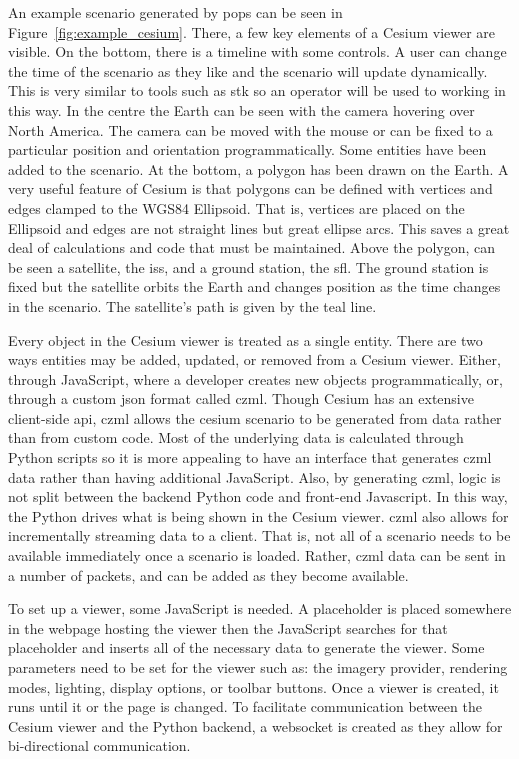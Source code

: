 An example scenario generated by \gls{pops} can be seen in
Figure~\ref{fig:example_cesium}. There, a few key elements of a Cesium viewer
are visible. On the bottom, there is a timeline with some controls. A user can
change the time of the scenario as they like and the scenario will update
dynamically. This is very similar to tools such as \gls{stk} so an operator
will be used to working in this way. In the centre the Earth can be seen with
the camera hovering over North America.  The camera can be moved with the mouse
or can be fixed to a particular position and orientation programmatically.
Some entities have been added to the scenario. At the bottom, a polygon has
been drawn on the Earth. A very useful feature of Cesium is that polygons can
be defined with vertices and edges clamped to the WGS84 Ellipsoid. That is,
vertices are placed on the Ellipsoid and edges are not straight lines but great
ellipse arcs. This saves a great deal of calculations and code that must be
maintained. Above the polygon, can be seen a satellite, the \gls{iss}, and a
ground station, the \gls{sfl}. The ground station is fixed but the satellite
orbits the Earth and changes position as the time changes in the scenario. The
satellite's path is given by the teal line. 

Every object in the Cesium viewer is treated as a single entity. There are two
ways entities may be added, updated, or removed from a Cesium viewer. Either,
through JavaScript, where a developer creates new objects programmatically, or,
through a custom \gls{json} format called \gls{czml}. Though Cesium has an
extensive client-side \gls{api}, \gls{czml} allows the cesium scenario to be
generated from data rather than from custom code. Most of the underlying data
is calculated through Python scripts so it is more appealing to have an
interface that generates \gls{czml} data rather than having additional
JavaScript. Also, by generating \gls{czml}, logic is not split between the
backend Python code and front-end Javascript. In this way, the Python drives
what is being shown in the Cesium viewer. \gls{czml} also allows for
incrementally streaming data to a client. That is, not all of a scenario needs
to be available immediately once a scenario is loaded. Rather, \gls{czml} data
can be sent in a number of packets, and can be added as they become available.

To set up a viewer, some JavaScript is needed. A placeholder is placed
somewhere in the webpage hosting the viewer then the JavaScript searches for
that placeholder and inserts all of the necessary data to generate the viewer.
Some parameters need to be set for the viewer such as: the imagery provider,
rendering modes, lighting, display options, or toolbar buttons. Once a viewer
is created, it runs until it or the page is changed.  To facilitate
communication between the Cesium viewer and the Python backend, a websocket is
created as they allow for bi-directional communication. 

